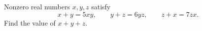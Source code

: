 Nonzero real numbers $x,y,z$ satisfy
\[
x+y=5xy,\qquad y+z=6yz,\qquad z+x=7zx .
\]
Find the value of $x+y+z$.
